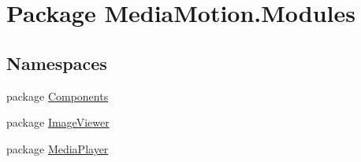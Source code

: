 \hypertarget{namespace_media_motion_1_1_modules}{\section{Package Media\+Motion.\+Modules}
\label{namespace_media_motion_1_1_modules}
}
\subsection*{Namespaces}
\begin{DoxyCompactItemize}
\item 
package \hyperlink{namespace_media_motion_1_1_modules_1_1_components}{Components}
\item 
package \hyperlink{namespace_media_motion_1_1_modules_1_1_image_viewer}{Image\+Viewer}
\item 
package \hyperlink{namespace_media_motion_1_1_modules_1_1_media_player}{Media\+Player}
\end{DoxyCompactItemize}
